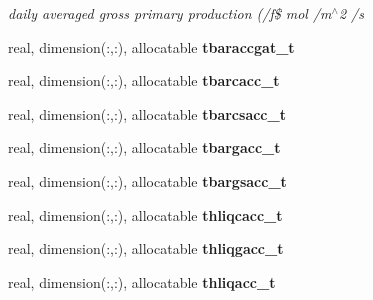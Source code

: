 \begin{DoxyCompactItemize}
\begin{DoxyCompactList}\small\item\em daily averaged gross primary production (/f\$ mol /m$^\wedge$2 /s \end{DoxyCompactList}\item 
\hypertarget{structctem__statevars_1_1ctem__tile__level_a5ecf80439ac52d3d943779bbf59e60ed}{}real, dimension(\+:,\+:), allocatable {\bfseries tbaraccgat\+\_\+t}\label{structctem__statevars_1_1ctem__tile__level_a5ecf80439ac52d3d943779bbf59e60ed}

\item 
\hypertarget{structctem__statevars_1_1ctem__tile__level_ac9ee769d5c062910063def0b88ba9019}{}real, dimension(\+:,\+:), allocatable {\bfseries tbarcacc\+\_\+t}\label{structctem__statevars_1_1ctem__tile__level_ac9ee769d5c062910063def0b88ba9019}

\item 
\hypertarget{structctem__statevars_1_1ctem__tile__level_a43d2b00e375ca89ba4adf8cd69c4e356}{}real, dimension(\+:,\+:), allocatable {\bfseries tbarcsacc\+\_\+t}\label{structctem__statevars_1_1ctem__tile__level_a43d2b00e375ca89ba4adf8cd69c4e356}

\item 
\hypertarget{structctem__statevars_1_1ctem__tile__level_a37a6186a407366d3fe271f5b3c9d8a70}{}real, dimension(\+:,\+:), allocatable {\bfseries tbargacc\+\_\+t}\label{structctem__statevars_1_1ctem__tile__level_a37a6186a407366d3fe271f5b3c9d8a70}

\item 
\hypertarget{structctem__statevars_1_1ctem__tile__level_af97aaf4e56f79f94695c885de7bf8cda}{}real, dimension(\+:,\+:), allocatable {\bfseries tbargsacc\+\_\+t}\label{structctem__statevars_1_1ctem__tile__level_af97aaf4e56f79f94695c885de7bf8cda}

\item 
\hypertarget{structctem__statevars_1_1ctem__tile__level_ae12bb2dbf97378036092811f77bf0c80}{}real, dimension(\+:,\+:), allocatable {\bfseries thliqcacc\+\_\+t}\label{structctem__statevars_1_1ctem__tile__level_ae12bb2dbf97378036092811f77bf0c80}

\item 
\hypertarget{structctem__statevars_1_1ctem__tile__level_a6d8c895528a39d9583eceb73d3901cec}{}real, dimension(\+:,\+:), allocatable {\bfseries thliqgacc\+\_\+t}\label{structctem__statevars_1_1ctem__tile__level_a6d8c895528a39d9583eceb73d3901cec}

\item 
\hypertarget{structctem__statevars_1_1ctem__tile__level_a17ea8b31241c9e2b195f200251244913}{}real, dimension(\+:,\+:), allocatable {\bfseries thliqacc\+\_\+t}\label{structctem__statevars_1_1ctem__tile__level_a17ea8b31241c9e2b195f200251244913}


\end{DoxyCompactItemize}
